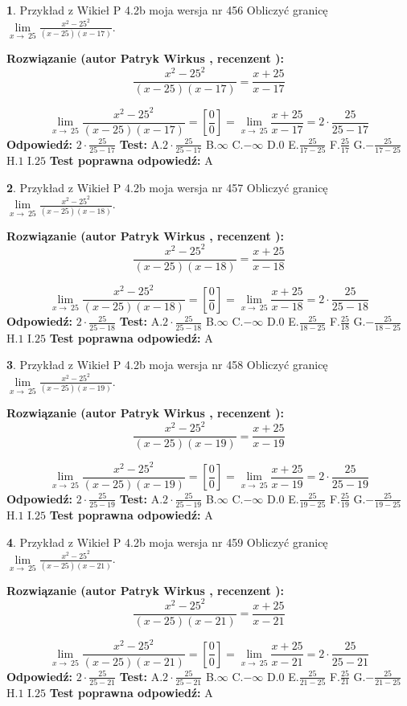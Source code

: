 \documentclass[12pt, a4paper]{article}
\theoremstyle{definition} %
\newtheorem{zad}{}
\newcommand{\zadStart}[1]{\begin{zad}#1\newline}
\newcommand{\zadStop}{\end{zad}}
\newcommand{\rozwStart}[2]{\noindent \textbf{Rozwiązanie (autor #1 , recenzent #2): }\newline}
\newcommand{\rozwStop}{\newline}
\newcommand{\odpStart}{\noindent \textbf{Odpowiedź:}\newline}
\newcommand{\odpStop}{\newline}
\newcommand{\testStart}{\noindent \textbf{Test:}\newline}
\newcommand{\testStop}{\newline}
\newcommand{\kluczStart}{\noindent \textbf{Test poprawna odpowiedź:}\newline}
\newcommand{\kluczStop}{\newline}
\begin{document}
\zadStart{Przykład z Wikieł P 4.2b moja wersja nr 456}
Obliczyć granicę $\lim\limits_{x\to\ 25}\frac{x^{2}-25^{2}}{(x-25)(x-17)}$.
\zadStop
\rozwStart{Patryk Wirkus}{}
$$\frac{x^{2}-25^{2}}{(x-25)(x-17)}=\frac{x+25}{x-17}$$

$$\lim\limits_{x\to\ 25}\frac{x^{2}-25^{2}}{(x-25)(x-17)}=[\frac{0}{0}]=\lim\limits_{x\to\ 25}\frac{x+25}{x-17}=2 \cdot \frac{25}{25-17}$$
\rozwStop
\odpStart
$2 \cdot \frac{25}{25-17}$
\odpStop
\testStart
A.$2 \cdot \frac{25}{25-17}$
B.$\infty$
C.$-\infty$
D.$0$
E.$\frac{25}{17-25}$
F.$\frac{25}{17}$
G.$-\frac{25}{17-25}$
H.$1$
I.$25$
\testStop
\kluczStart
A
\kluczStop



\zadStart{Przykład z Wikieł P 4.2b moja wersja nr 457}
Obliczyć granicę $\lim\limits_{x\to\ 25}\frac{x^{2}-25^{2}}{(x-25)(x-18)}$.
\zadStop
\rozwStart{Patryk Wirkus}{}
$$\frac{x^{2}-25^{2}}{(x-25)(x-18)}=\frac{x+25}{x-18}$$

$$\lim\limits_{x\to\ 25}\frac{x^{2}-25^{2}}{(x-25)(x-18)}=[\frac{0}{0}]=\lim\limits_{x\to\ 25}\frac{x+25}{x-18}=2 \cdot \frac{25}{25-18}$$
\rozwStop
\odpStart
$2 \cdot \frac{25}{25-18}$
\odpStop
\testStart
A.$2 \cdot \frac{25}{25-18}$
B.$\infty$
C.$-\infty$
D.$0$
E.$\frac{25}{18-25}$
F.$\frac{25}{18}$
G.$-\frac{25}{18-25}$
H.$1$
I.$25$
\testStop
\kluczStart
A
\kluczStop



\zadStart{Przykład z Wikieł P 4.2b moja wersja nr 458}
Obliczyć granicę $\lim\limits_{x\to\ 25}\frac{x^{2}-25^{2}}{(x-25)(x-19)}$.
\zadStop
\rozwStart{Patryk Wirkus}{}
$$\frac{x^{2}-25^{2}}{(x-25)(x-19)}=\frac{x+25}{x-19}$$

$$\lim\limits_{x\to\ 25}\frac{x^{2}-25^{2}}{(x-25)(x-19)}=[\frac{0}{0}]=\lim\limits_{x\to\ 25}\frac{x+25}{x-19}=2 \cdot \frac{25}{25-19}$$
\rozwStop
\odpStart
$2 \cdot \frac{25}{25-19}$
\odpStop
\testStart
A.$2 \cdot \frac{25}{25-19}$
B.$\infty$
C.$-\infty$
D.$0$
E.$\frac{25}{19-25}$
F.$\frac{25}{19}$
G.$-\frac{25}{19-25}$
H.$1$
I.$25$
\testStop
\kluczStart
A
\kluczStop



\zadStart{Przykład z Wikieł P 4.2b moja wersja nr 459}
Obliczyć granicę $\lim\limits_{x\to\ 25}\frac{x^{2}-25^{2}}{(x-25)(x-21)}$.
\zadStop
\rozwStart{Patryk Wirkus}{}
$$\frac{x^{2}-25^{2}}{(x-25)(x-21)}=\frac{x+25}{x-21}$$

$$\lim\limits_{x\to\ 25}\frac{x^{2}-25^{2}}{(x-25)(x-21)}=[\frac{0}{0}]=\lim\limits_{x\to\ 25}\frac{x+25}{x-21}=2 \cdot \frac{25}{25-21}$$
\rozwStop
\odpStart
$2 \cdot \frac{25}{25-21}$
\odpStop
\testStart
A.$2 \cdot \frac{25}{25-21}$
B.$\infty$
C.$-\infty$
D.$0$
E.$\frac{25}{21-25}$
F.$\frac{25}{21}$
G.$-\frac{25}{21-25}$
H.$1$
I.$25$
\testStop
\kluczStart
A
\kluczStop
\end{document}
